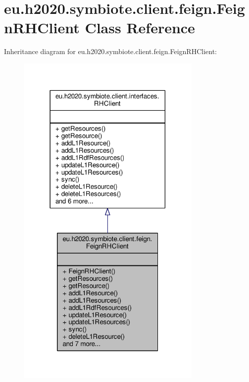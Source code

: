 \hypertarget{classeu_1_1h2020_1_1symbiote_1_1client_1_1feign_1_1FeignRHClient}{}\section{eu.\+h2020.\+symbiote.\+client.\+feign.\+Feign\+R\+H\+Client Class Reference}
\label{classeu_1_1h2020_1_1symbiote_1_1client_1_1feign_1_1FeignRHClient}


Inheritance diagram for eu.\+h2020.\+symbiote.\+client.\+feign.\+Feign\+R\+H\+Client\+:
\nopagebreak
\begin{figure}[H]
\begin{center}
\leavevmode
\includegraphics[width=254pt]{classeu_1_1h2020_1_1symbiote_1_1client_1_1feign_1_1FeignRHClient__inherit__graph}
\end{center}
\end{figure}


